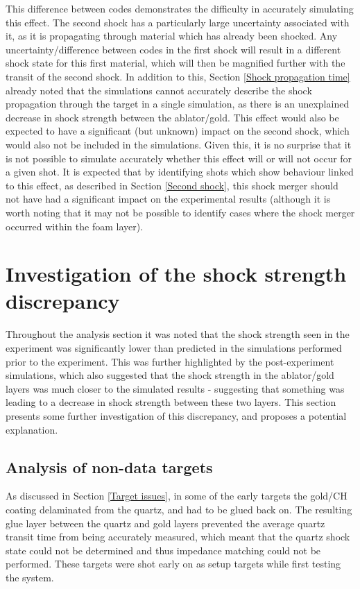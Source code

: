 This difference between codes demonstrates the difficulty in accurately simulating this effect. The second shock has a particularly large uncertainty associated with it, as it is propagating through material which has already been shocked. Any uncertainty/difference between codes in the first shock will result in a different shock state for this first material, which will then be magnified further with the transit of the second shock. In addition to this, Section \ref{Shock propagation time} already noted that the simulations cannot accurately describe the shock propagation through the target in a single simulation, as there is an unexplained decrease in shock strength between the ablator/gold. This effect would also be expected to have a significant (but unknown) impact on the second shock, which would also not be included in the simulations. Given this, it is no surprise that it is not possible to simulate accurately whether this effect will or will not occur for a given shot. It is expected that by identifying shots which show behaviour linked to this effect, as described in Section \ref{Second shock}, this shock merger should not have had a significant impact on the experimental results (although it is worth noting that it may not be possible to identify cases where the shock merger occurred within the foam layer).

\section{Investigation of the shock strength discrepancy} \label{Weak quartz shock}

Throughout the analysis section it was noted that the shock strength seen in the experiment was significantly lower than predicted in the simulations performed prior to the experiment. This was further highlighted by the post-experiment simulations, which also suggested that the shock strength in the ablator/gold layers was much closer to the simulated results - suggesting that something was leading to a decrease in shock strength between these two layers. This section presents some further investigation of this discrepancy, and proposes a potential explanation.

\subsection{Analysis of non-data targets} \label{Non-data targets}

As discussed in Section \ref{Target issues}, in some of the early targets the gold/CH coating delaminated from the quartz, and had to be glued back on. The resulting glue layer between the quartz and gold layers prevented the average quartz transit time from being accurately measured, which meant that the quartz shock state could not be determined and thus impedance matching could not be performed. These targets were shot early on as setup targets while first testing the system. 


